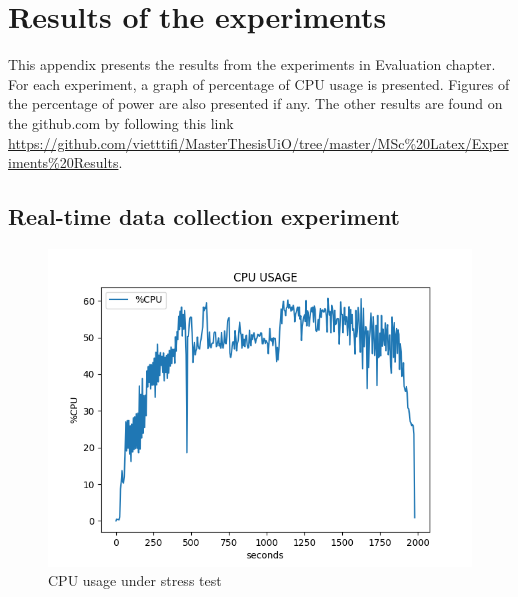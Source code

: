 
\chapter{Results of the experiments}
\label{AppendixB}
This appendix presents the results from the experiments in Evaluation chapter. For each experiment, a graph of percentage of CPU usage is presented. Figures of the percentage of power are also presented if any. The other results are found on the github.com by following this link \href{https://github.com/vietttifi/MasterThesisUiO/tree/master/MSc%20Latex/Experiments%20Results}{https://github.com/vietttifi/MasterThesisUiO/tree/master/MSc\%20Latex/Experiments\%20Results}.
\section{Real-time data collection experiment}
\begin{figure}
    \centering
    \includegraphics[width=1.0\textwidth]{Figures/StressTest.png}
    \caption{CPU usage under stress test}
    \label{fig:Figures/REALTIME_RESULT}
\end{figure}
